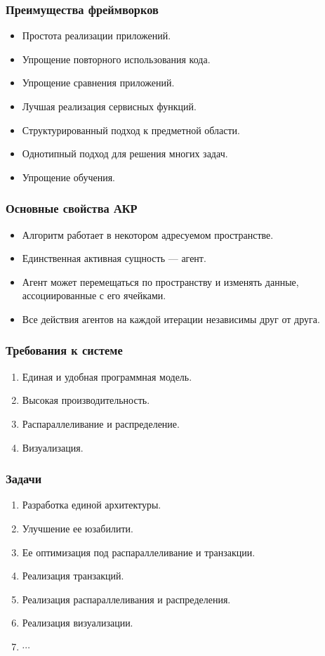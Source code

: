 \documentclass[14pt]{beamer}
\begin{document}
\begin{frame}
    \frametitle{Преимущества фреймворков}
    \begin{itemize}
        \item Простота реализации приложений.
        \item Упрощение повторного использования кода.
        \item Упрощение сравнения приложений.
        \item Лучшая реализация сервисных функций.
        \item Структурированный подход к предметной области.
        \item Однотипный подход для решения многих задач.
        \item Упрощение обучения.
    \end{itemize}
\end{frame}

\begin{frame}
    \frametitle{Основные свойства АКР}
    \begin{itemize}
        \item Алгоритм работает в некотором адресуемом пространстве.
        \item Единственная активная сущность --- агент.
        \item Агент может перемещаться по пространству и изменять данные, ассоциированные с его ячейками.
        \item Все действия агентов на каждой итерации независимы друг от друга.
    \end{itemize}
\end{frame}

\begin{frame}[<+->]
    \frametitle{Требования к системе}
    \begin{enumerate}
        \item Единая и удобная программная модель.
        \item Высокая производительность.
        \item Распараллеливание и распределение.
        \item Визуализация.
    \end{enumerate}
\end{frame}

\begin{frame}
    \frametitle{Задачи}
    \begin{enumerate}
        \item<1> Разработка единой архитектуры.
        \item<1> Улучшение ее юзабилити.
        \item<1> Ее оптимизация под распараллеливание и транзакции.
        \item<1-2> Реализация транзакций.
        \item<1> Реализация распараллеливания и распределения.
        \item<1> Реализация визуализации.
        \item<1>  $\cdots$
    \end{enumerate}
\end{frame}
\end{document}
